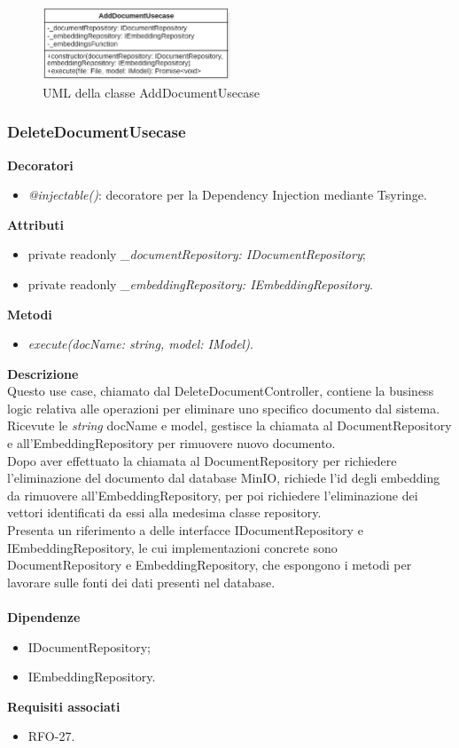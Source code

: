 \begin{figure}[h!]
    \centering  
    \includegraphics[width=0.5\textwidth]{AddDocumentUsecase.png}
    \caption{UML della classe AddDocumentUsecase}
\end{figure}

\subsubsection{DeleteDocumentUsecase}
\textbf{Decoratori}
\begin{itemize}
    \item \textit{@injectable()}: decoratore per la Dependency Injection mediante Tsyringe.
\end{itemize}
\textbf{Attributi}
\begin{itemize}[itemsep=-4pt]
    \item private readonly \textit{\_documentRepository: IDocumentRepository};
    \item private readonly \textit{\_embeddingRepository: IEmbeddingRepository}.
\end{itemize}
\textbf{Metodi}
\begin{itemize}
    \item \textit{execute(docName: string, model: IModel)}.
\end{itemize}
\textbf{Descrizione}\\
Questo use case, chiamato dal DeleteDocumentController, contiene la business logic relativa alle operazioni per eliminare uno specifico documento dal sistema. Ricevute le \textit{string} docName e model, gestisce la chiamata al DocumentRepository e all'EmbeddingRepository per rimuovere nuovo documento.\\
Dopo aver effettuato la chiamata al DocumentRepository per richiedere l'eliminazione del documento dal database MinIO, richiede l'id degli embedding da rimuovere all'EmbeddingRepository, per poi richiedere l'eliminazione dei vettori identificati da essi alla medesima classe repository.\\
Presenta un riferimento a delle interfacce IDocumentRepository e IEmbeddingRepository, le cui implementazioni concrete sono DocumentRepository e EmbeddingRepository, che espongono i metodi per lavorare sulle fonti dei dati presenti nel database. \\ \\
\textbf{Dipendenze}
\begin{itemize}[itemsep=-4pt]
    \item IDocumentRepository;
    \item IEmbeddingRepository.
\end{itemize}
\textbf{Requisiti associati}
\begin{itemize}
    \item RFO-27.
\end{itemize}

